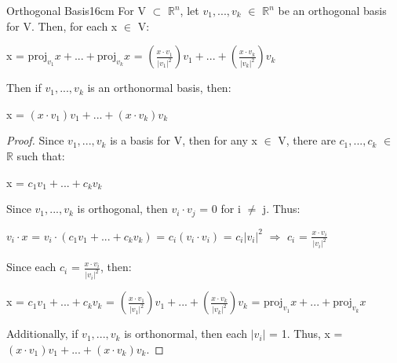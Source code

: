     \vspace{0.5cm}



    \begin{wtheorem}{Orthogonal Basis}{16cm}
        For V $\subset$ $\mathbb{R}^n$, let $v_1,...,v_k$ $\in$ $\mathbb{R}^n$
        be an orthogonal basis for V. Then, for each x $\in$ V:

        \hspace{0.5cm}
        x = $\text{proj}_{v_1}x + ... + \text{proj}_{v_k}x$
        = $(\frac{x \cdot v_1}{|v_1|^2})v_1
            + ... + (\frac{x \cdot v_k}{|v_k|^2})v_k$

        Then if $v_1,...,v_k$ is an orthonormal basis, then:

        \hspace{0.5cm}
        x = $(x \cdot v_1)v_1 + ... + (x \cdot v_k)v_k$
    \end{wtheorem}

    \begin{proof}
        Since $v_1,...,v_k$ is a basis for V, then for any x $\in$ V,
        there are $c_1,...,c_k$ $\in$ $\mathbb{R}$ such that:

        \hspace{0.5cm}
        x = $c_1v_1 + ... + c_kv_k$

        Since $v_1,...,v_k$ is orthogonal, then
        $v_i \cdot v_j$ = 0 for i $\not =$ j. Thus:

        \hspace{0.5cm}
        $v_i \cdot x$ = $v_i \cdot (c_1v_1 + ... + c_kv_k)$
        = $c_i(v_i \cdot v_i)$
        = $c_i|v_i|^2$
        \hspace{0.5cm}
        $\Rightarrow$
        \hspace{0.5cm}
        $c_i$ = $\frac{x \cdot v_i}{|v_i|^2}$

        Since each $c_i$ = $\frac{x \cdot v_i}{|v_i|^2}$, then:
        
        \hspace{0.5cm}
        x = $c_1v_1 + ... + c_kv_k$
        = $(\frac{x \cdot v_1}{|v_1|^2})v_1
            + ... + (\frac{x \cdot v_k}{|v_k|^2})v_k$
        = $\text{proj}_{v_1}x + ... + \text{proj}_{v_k}x$

        Additionally, if $v_1,...,v_k$ is orthonormal,
        then each $|v_i|$ = 1. Thus,
        x = $(x \cdot v_1)v_1 + ... + (x \cdot v_k)v_k$.
    \end{proof}

    \vspace{0.5cm}



